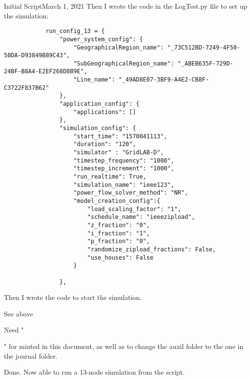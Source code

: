 \begin{entry}{Initial Script}{March 1, 2021}
        Then I wrote the code in the LogTest.py file to set up the simulation:
        \begin{verbatim}
            run_config_13 = {
                "power_system_config": {
                    "GeographicalRegion_name": "_73C512BD-7249-4F50-50DA-D93849B89C43",
                    "SubGeographicalRegion_name": "_ABEB635F-729D-24BF-B8A4-E2EF268D8B9E",
                    "Line_name": "_49AD8E07-3BF9-A4E2-CB8F-C3722F837B62"
                },
                "application_config": {
                    "applications": []
                },
                "simulation_config": {
                    "start_time": "1570041113",
                    "duration": "120",
                    "simulator" : "GridLAB-D",
                    "timestep_frequency": "1000",
                    "timestep_increment": "1000",
                    "run_realtime": True,
                    "simulation_name": "ieee123",
                    "power_flow_solver_method": "NR",
                    "model_creation_config":{
                        "load_scaling_factor": "1",
                        "schedule_name": "ieeezipload",
                        "z_fraction": "0",
                        "i_fraction": "1",
                        "p_fraction": "0",
                        "randomize_zipload_fractions": False,
                        "use_houses": False
                    }

                },
        \end{verbatim}

        Then I wrote the code to start the simulation.

    \parameters

    See above

    \observations

        Need "{\usepackage[outputdir=auxil]{minted}}" for minted in this document, as well as to change the auxil
    folder to the one in the journal folder.


    \results

    Done. Now able to run a 13-node simulation from the script.

\end{entry}